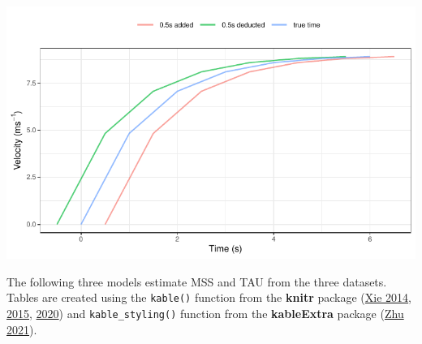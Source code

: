 \documentclass[fleqn,10pt,lineno]{wlpeerj} %
\begin{document}
\begin{center}\includegraphics[width=0.9\linewidth]{paper_files/figure-latex/unnamed-chunk-19-1} \end{center}

The following three models estimate MSS and TAU from the three datasets. Tables are created using the \texttt{kable()} function from the \textbf{knitr} package (\protect\hyperlink{ref-knitr2014}{Xie 2014}, \protect\hyperlink{ref-knitr2015}{2015}, \protect\hyperlink{ref-R-knitr}{2020}) and \texttt{kable\_styling()} function from the \textbf{kableExtra} package (\protect\hyperlink{ref-R-kableExtra}{Zhu 2021}).
\end{document}
